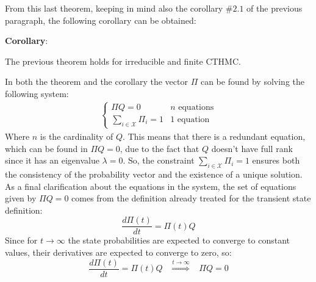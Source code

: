 \documentclass[12pt,a4paper]{article}
\begin{document}
\noindent
From this last theorem, keeping in mind also the corollary $\#2.1$ of the previous paragraph, the following corollary can be obtained:

\bigskip
\noindent
\textbf{Corollary}: 

\noindent
The previous theorem holds for irreducible and finite CTHMC.

\bigskip
\noindent
In both the theorem and the corollary the vector $\Pi$ can be found by solving the following system:
$$
\begin{matrix}
\begin{cases}
\Pi Q=0 & n \textrm{ equations}\\
\underset{i\in\mathcal{X}}{\sum{}}{\Pi_i=1} & 1 \textrm{ equation}
\end{cases}
\end{matrix}
$$
Where $n$ is the cardinality of $Q$. This means that there is a redundant equation, which can be found in $\Pi Q=0$, due to the fact that $Q$ doesn't have full rank since it has an eigenvalue $\lambda =0$. So, the constraint $\sum_{i\in\mathcal{X}}{\Pi_i=1}$ ensures both the consistency of the probability vector and the existence of a unique solution.
As a final clarification about the equations in the system, the set of equations given by $\Pi Q=0$ comes from the definition already treated for the transient state definition:
$$
\frac{d\Pi(t)}{dt}=\Pi(t)Q
$$ 
Since for $t\rightarrow\infty$ the state probabilities are expected to converge to constant values, their derivatives are expected to converge to zero, so:
$$
\frac{d\Pi(t)}{dt}=\Pi(t)Q \hspace{10pt} \overset{t\rightarrow\infty}{\Rightarrow}\hspace{10pt} \Pi Q=0
$$
\newpage
\end{document}
